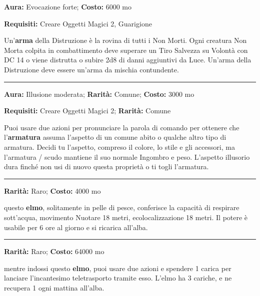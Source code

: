 \begin{multicols}{2}
\textbf{Aura:} Evocazione forte; \textbf{Costo:} 6000 mo

\textbf{Requisiti:} Creare Oggetti Magici 2, Guarigione

Un'\textbf{arma} della Distruzione è la rovina di tutti i Non Morti. Ogni creatura Non Morta colpita in combattimento deve superare un Tiro Salvezza su Volontà con DC 14 o viene distrutta o subire 2d8 di danni aggiuntivi da Luce. Un'arma della Distruzione deve essere un'arma da mischia contundente.

\smallskip\noindent\rule{\linewidth}{2pt}  \hypertarget{Elegante}{}\smallskip{}\noindent\label{Elegante}

\textbf{Aura:} Illusione moderata; \textbf{Rarità:} Comune; \textbf{Costo:} 3000 mo

\textbf{Requisiti:} Creare Oggetti Magici 2; \textbf{Rarità:} Comune

Puoi usare due azioni per pronunciare la parola di comando per ottenere che l'\textbf{armatura} assuma l'aspetto di un comune abito o qualche altro tipo di armatura. Decidi tu l'aspetto, compreso il colore, lo stile e gli accessori, ma l'armatura / scudo mantiene il suo normale Ingombro e peso. L'aspetto illusorio dura finché non usi di nuovo questa proprietà o ti togli l'armatura.

\smallskip\noindent\rule{\linewidth}{2pt}  \hypertarget{ElmodelMovimentosubacqueo}{}\smallskip{}\noindent\label{ElmodelMovimentosubacqueo}

\textbf{Rarità:} Raro; \textbf{Costo:} 4000 mo

questo \textbf{elmo}, solitamente in pelle di pesce, conferisce la capacità di respirare sott'acqua, movimento Nuotare 18 metri, ecolocalizzazione 18 metri. Il potere è usabile per 6 ore al giorno e si ricarica all'alba.

\smallskip\noindent\rule{\linewidth}{2pt}  \hypertarget{ElmodelTeletrasporto}{}\smallskip{}\noindent\label{ElmodelTeletrasporto}

\textbf{Rarità:} Raro; \textbf{Costo:} 64000 mo

mentre indossi questo \textbf{elmo}, puoi usare due azioni e spendere 1 carica per lanciare l'incantesimo teletrasporto tramite esso. L'elmo ha 3 cariche, e ne recupera 1 ogni mattina all'alba.


\end{multicols}
